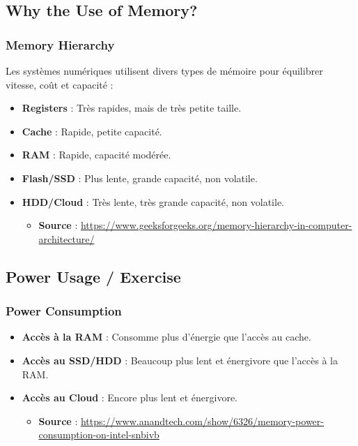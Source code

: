 \documentclass[10pt,a4paper]{article}
\begin{document}
\subsection*{Why the Use of Memory?}

\subsubsection*{Memory Hierarchy}
Les systèmes numériques utilisent divers types de mémoire pour équilibrer vitesse, coût et capacité :
\begin{itemize}
    \item \textbf{Registers} : Très rapides, mais de très petite taille.
    \item \textbf{Cache} : Rapide, petite capacité.
    \item \textbf{RAM} : Rapide, capacité modérée.
    \item \textbf{Flash/SSD} : Plus lente, grande capacité, non volatile.
    \item \textbf{HDD/Cloud} : Très lente, très grande capacité, non volatile.
    \begin{itemize}
        \item \textbf{Source} : \url{https://www.geeksforgeeks.org/memory-hierarchy-in-computer-architecture/}
    \end{itemize}
\end{itemize}

\subsection*{Power Usage / Exercise}

\subsubsection*{Power Consumption}
\begin{itemize}
    \item \textbf{Accès à la RAM} : Consomme plus d'énergie que l'accès au cache.
    \item \textbf{Accès au SSD/HDD} : Beaucoup plus lent et énergivore que l'accès à la RAM.
    \item \textbf{Accès au Cloud} : Encore plus lent et énergivore.
    \begin{itemize}
        \item \textbf{Source} : \url{https://www.anandtech.com/show/6326/memory-power-consumption-on-intel-snbivb}
    \end{itemize}
\end{itemize}
\end{document}
